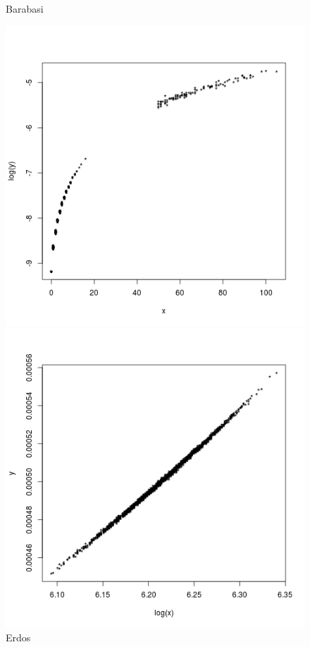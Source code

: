 \documentclass[palatino]{apuntes}
\begin{document}
\begin{figure}[h!] 
\centering 
\begin{minipage}[b]{0.4\textwidth}
	\caption{Barabasi}
	\includegraphics[scale=0.45]{img/barabasi_grado-pr}
\end{minipage}
\hfill
\begin{minipage}[b]{0.4\textwidth}
	\caption{Erdos}
	\includegraphics[scale=0.45]{img/erdos_grado-pr}
\end{minipage}
\end{figure} 
\end{document}
